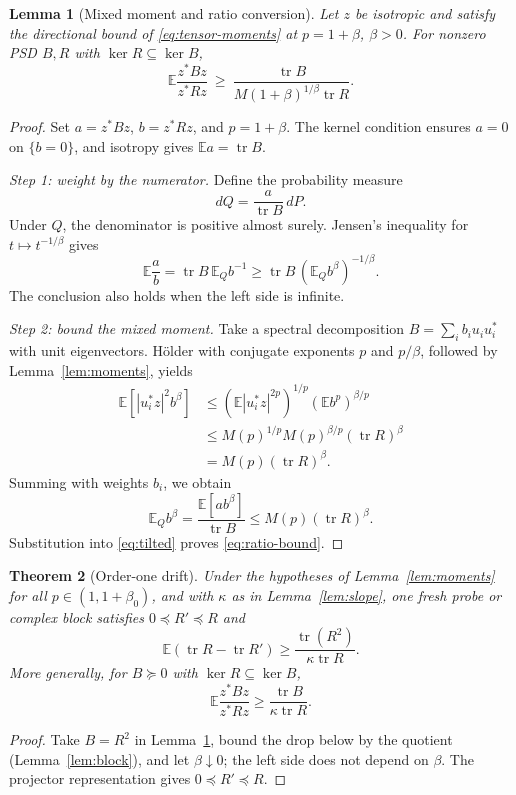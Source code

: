 \documentclass[11pt,a4paper]{article}
\newtheorem{theorem}{Theorem}[section]
\newtheorem{lemma}[theorem]{Lemma}
\theoremstyle{definition}\newtheorem{definition}[theorem]{Definition}
\theoremstyle{remark}\newtheorem{remark}[theorem]{Remark}
\numberwithin{equation}{section}
\newcommand{\E}{\mathbb E}
\newcommand{\tr}{\operatorname{tr}}
\begin{document}
\begin{lemma}[Mixed moment and ratio conversion]\label{lem:ratio}
Let $z$ be isotropic and satisfy the directional bound of
\eqref{eq:tensor-moments} at $p=1+\beta$, $\beta>0$. For nonzero PSD $B,R$ with
$\ker R\subseteq\ker B$,
\begin{equation}\label{eq:ratio-bound}
 \E\frac{z^*Bz}{z^*Rz}\ \ge\ \frac{\tr B}{M(1+\beta)^{1/\beta}\tr R}.
\end{equation}
\end{lemma}
\begin{proof}
Set \(a=z^*Bz\), \(b=z^*Rz\), and \(p=1+\beta\).
The kernel condition ensures \(a=0\) on \(\{b=0\}\), and isotropy gives
\(\E a=\tr B\).

\emph{Step 1: weight by the numerator.}
Define the probability measure
\[
 dQ=\frac{a}{\tr B}\,dP.
\]
Under \(Q\), the denominator is positive almost surely. Jensen's
inequality for \(t\mapsto t^{-1/\beta}\) gives
\begin{equation}\label{eq:tilted}
 \E\frac ab
 =\tr B\,\E_Q b^{-1}
 \ge \tr B\,(\E_Q b^\beta)^{-1/\beta}.
\end{equation}
The conclusion also holds when the left side is infinite.

\emph{Step 2: bound the mixed moment.}
Take a spectral decomposition \(B=\sum_i b_i u_i u_i^*\) with unit
eigenvectors. H\"older with conjugate exponents \(p\) and \(p/\beta\),
followed by Lemma~\ref{lem:moments}, yields
\begin{align*}
 \E[|u_i^*z|^2 b^\beta]
 &\le (\E|u_i^*z|^{2p})^{1/p}
       (\E b^p)^{\beta/p}\\
 &\le M(p)^{1/p}M(p)^{\beta/p}(\tr R)^\beta\\
 &=M(p)(\tr R)^\beta.
\end{align*}
Summing with weights \(b_i\), we obtain
\[
 \E_Q b^\beta
 =\frac{\E[a b^\beta]}{\tr B}
 \le M(p)(\tr R)^\beta.
\]
Substitution into \eqref{eq:tilted} proves \eqref{eq:ratio-bound}.
\end{proof}

\begin{theorem}[Order-one drift]\label{thm:drift}
Under the hypotheses of Lemma~\ref{lem:moments} for all $p\in(1,1+\beta_0)$, and
with $\kappa$ as in Lemma~\ref{lem:slope}, one fresh probe or complex block satisfies
$0\preceq R'\preceq R$ and
\begin{equation}\label{eq:main-drift}
 \E(\tr R-\tr R')\ge\frac{\tr(R^2)}{\kappa\tr R}.
\end{equation}
More generally, for $B\succeq0$ with $\ker R\subseteq\ker B$,
\begin{equation}\label{eq:weighted}
 \E\frac{z^*Bz}{z^*Rz}\ge\frac{\tr B}{\kappa\tr R}.
\end{equation}
\end{theorem}
\begin{proof}
Take $B=R^2$ in Lemma~\ref{lem:ratio}, bound the drop below by the quotient
(Lemma~\ref{lem:block}), and let $\beta\downarrow0$; the left side does not depend
on $\beta$. The projector representation gives $0\preceq R'\preceq R$.
\end{proof}
\end{document}

